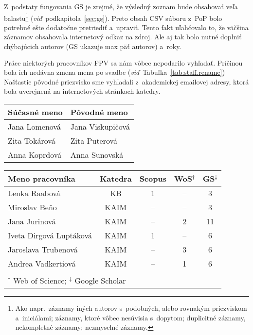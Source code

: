 Z~podstaty fungovania GS je zrejmé, že výsledný zoznam bude obsahovať veľa
balastu\footnote{Ako napr.~záznamy iných autorov s~podobných, alebo rovnakým
  priezviskom a~iniciálami; záznamy, ktoré vôbec nesúvisia s~dopytom; duplicitné
  záznamy, nekompletné záznamy; nezmyselné záznamy.}
(\emph{viď}~podkapitola~\ref{sec:gs}).  Preto obsah CSV súboru z~PoP bolo
potrebné ešte dodatočne pretriediť a~upraviť.  Tento fakt uľahčovalo to, že
väčšina záznamov obsahovala internetový odkaz na zdroj.  Ale aj tak bolo nutné
doplniť chýbajúcich autorov (GS ukazuje max päť autorov) a~roky.

Práce niektorých pracovníkov FPV sa nám vôbec nepodarilo vyhľadať.  Príčinou
bola ich nedávna zmena mena po svadbe (\emph{viď}~Tabuľka~\ref{tab:staff.rename})
Našťastie pôvodné priezvisko sme vyhľadali z~akademickej emailovej adresy, ktorá
bola uverejnená na internetových stránkach katedry.

\begin{SCtable}
  \centering\small
  \caption[Mená pracovníkov FPV, u~ktorých došlo k~zmene priezviska]%
  {Zoznam pracovníkov Fakulty prírodných vied UCM v~Trnave, u~ktorých došlo k~zmene
  priezviska.  Pôvodné priezvisko sme vyhľadali z~akademickej emailovej adresy.}
  \label{tab:staff.rename}
  \begin{tabular}{ll}
    \toprule
    Súčasné meno & Pôvodné meno \\
    \midrule
    Jana Lomenová & Jana Viskupičová \\
    Zita Tokárová & Zita Puterová    \\
    Anna Koprdová & Anna Sunovská    \\
    \bottomrule
  \end{tabular}
\end{SCtable}

\begin{SCtable}
  \centering\small
  \caption[Mená pracovníkov FPV, u ktorých sa nám nepodarilo získať všetky dáta]%
  {Zoznam Pracovníkov FPV, pre ktorých sa nepodarilo získať z~niektorých
    citačných registrov žiadne dáta.  V~posledných troch stĺpcoch je uvedený
    počet publikácií, ktoré sa nám podarilo získať.}
  \label{tab:staff.missing}
  \begin{tabular}{lcccc}
    \toprule
    Meno pracovníka & Katedra & Scopus & WoS$^\dagger$ & GS$^\ddagger$ \\
    \midrule
    Lenka Raabová           &  KB  & 1  & --  & 3  \\
    Miroslav Beňo           & KAIM & -- & --  & 3  \\
    Jana Jurinová           & KAIM & -- & 2   & 11 \\
    Iveta Dirgová Luptáková & KAIM & 1  & --  & 6  \\
    Jaroslava Trubenová     & KAIM & -- & 3   & 6  \\
    Andrea Vadkertiová      & KAIM & -- & 1   & 6  \\
    \bottomrule \\[-2ex]
    \multicolumn{5}{l}{\footnotesize $^\dagger$ Web of Science; $^\ddagger$ Google Scholar}
  \end{tabular}
\end{SCtable}


